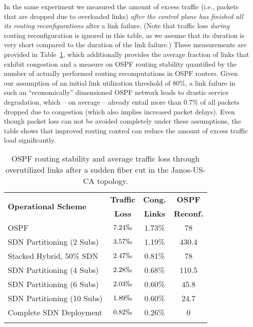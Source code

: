 \documentclass[journal]{IEEEtran}
\begin{document}
In the same experiment we measured the amount of excess traffic (i.e., packets that are dropped due to overloaded links) \emph{after the control plane has finished all its routing reconfigurations} after a link failure. (Note that traffic loss \emph{during} routing reconfiguration is ignored in this table, as we assume that its duration is very short compared to the duration of the link failure.) These measurements are provided in Table~\ref{droppedpackets}, which additionally provides the average fraction of links that exhibit congestion and a measure on OSPF routing stability quantified by the number of actually performed routing recomputations in OSPF routers. Given our assumption of an initial link utilization threshold of 80\%, a link failure in such an ``economically'' dimensioned OSPF network leads to drastic service degradation, which -- on average -- already entail more than 0.7\% of all packets dropped due to congestion (which also implies increased packet delays). Even though packet loss can not be avoided completely under these assumptions, the table shows that improved routing control can reduce the amount of excess traffic load significantly.

\begin{table}[t]\begin{center}\footnotesize
\begin{tabular}{ l c c c}
\toprule
\multirow{2}{*}{\textbf{Operational Scheme}} & \textbf{Traffic} & \textbf{Cong.} & \textbf{OSPF} \\
                                             & \textbf{Loss}    & \textbf{Links} & \textbf{Reconf.} \\
\midrule
OSPF & $7.24\permil$ & 1.73\% & 78 \\\addlinespace[1.0mm]
SDN Partitioning (2 Subs) & $3.57\permil$ & 1.19\% & 430.4 \\\addlinespace[1.0mm]
Stacked Hybrid, 50\% SDN & $2.47\permil$ & 0.81\% & 78 \\\addlinespace[1.0mm]
SDN Partitioning (4 Subs) & $2.28\permil$ & 0.68\% & 110.5 \\\addlinespace[1.0mm]
SDN Partitioning (6 Subs) & $2.03\permil$ & 0.60\% & 45.8 \\\addlinespace[1.0mm]
SDN Partitioning (10 Subs) & $1.89\permil$ & 0.60\% & 24.7 \\\addlinespace[1.0mm]
Complete SDN Deployment & $0.82\permil$ & 0.26\% & 0 \\\addlinespace[1.0mm]
\bottomrule
\end{tabular}\normalsize
\caption{OSPF routing stability and average traffic loss through overutilized links after a sudden fiber cut in the Janos-US-CA topology.}\label{droppedpackets}
\end{center}\end{table}
\end{document}
